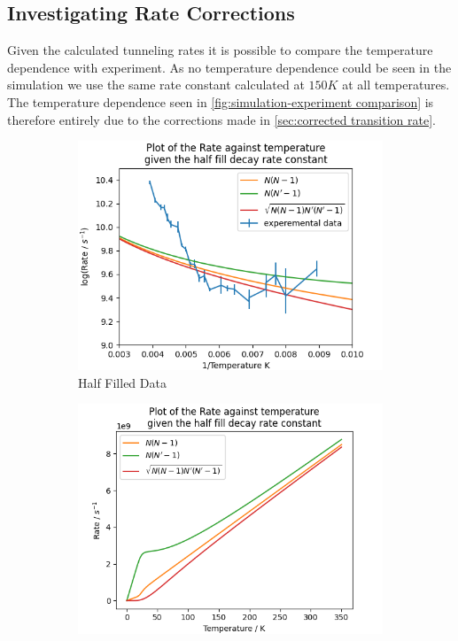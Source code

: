 \subsection{Investigating Rate Corrections}
Given the calculated tunneling rates
it is possible to compare
the temperature dependence
with experiment.
As no temperature dependence
could be seen in the
simulation we use
the same rate constant calculated
at \(150K\) at all temperatures.
The temperature dependence
seen in \cref{fig:simulation-experiment comparison}
is therefore entirely
due to the corrections
made in
\cref{sec:corrected transition rate}.
\begin{figure}[htbp]
    \captionsetup[subfigure]{justification=centering}
    \centering
    \begin{subfigure}{0.3\linewidth}
        \centering
        \includegraphics[width =0.9 \linewidth]{Figures/Simulation/Decay rate against temperature half fill 150K 1 spin.png}
        \caption{Half Filled Data
        }\label{sub@fig:half filled rates with experiment}
    \end{subfigure}
    \hfill
    \begin{subfigure}{0.3\linewidth}
        \centering
        \includegraphics[width = 0.9\linewidth]{Figures/Simulation/Decay rate against temperature half fill 150K 1 spin low temp.png}

\end{subfigure}
\end{figure}
